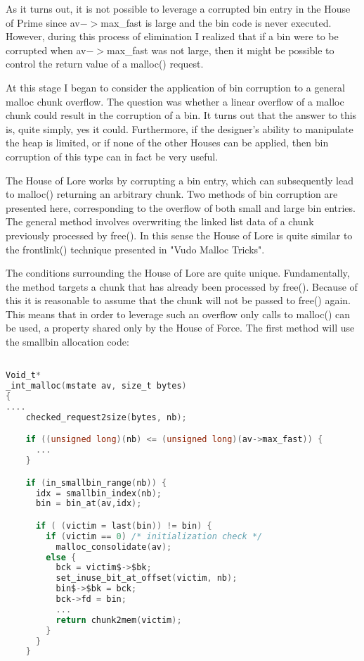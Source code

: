 \documentclass[12pt]{article}
\begin{document}
As it turns out, it is not possible to leverage a corrupted bin
entry in the House of Prime since av$->$max\_fast is large and the bin
code is never executed. However, during this process of elimination
I realized that if a bin were to be corrupted when av$->$max\_fast was
not large, then it might be possible to control the return value of
a malloc() request.
\newline


At this stage I began to consider the application of bin corruption
to a general malloc chunk overflow. The question was whether a
linear overflow of a malloc chunk could result in the corruption of
a bin. It turns out that the answer to this is, quite simply, yes
it could. Furthermore, if the designer's ability to manipulate the
heap is limited, or if none of the other Houses can be applied,
then bin corruption of this type can in fact be very useful.
\newline


The House of Lore works by corrupting a bin entry, which can
subsequently lead to malloc() returning an arbitrary chunk. Two
methods of bin corruption are presented here, corresponding to the
overflow of both small and large bin entries. The general method
involves overwriting the linked list data of a chunk previously
processed by free(). In this sense the House of Lore is quite
similar to the frontlink() technique presented in "Vudo Malloc
Tricks".
\newline


The conditions surrounding the House of Lore are quite unique.
Fundamentally, the method targets a chunk that has already been
processed by free(). Because of this it is reasonable to assume
that the chunk will not be passed to free() again. This means that
in order to leverage such an overflow only calls to malloc() can be
used, a property shared only by the House of Force. The first
method will use the smallbin allocation code:

\begin{lstlisting}[language=C]

Void_t*
_int_malloc(mstate av, size_t bytes)
{
....
    checked_request2size(bytes, nb);

    if ((unsigned long)(nb) <= (unsigned long)(av->max_fast)) {
      ...
    }

    if (in_smallbin_range(nb)) {
      idx = smallbin_index(nb);
      bin = bin_at(av,idx);

      if ( (victim = last(bin)) != bin) {
        if (victim == 0) /* initialization check */
          malloc_consolidate(av);
        else {
          bck = victim$->$bk;
          set_inuse_bit_at_offset(victim, nb);
          bin$->$bk = bck;
          bck->fd = bin;
          ...
          return chunk2mem(victim);
        }
      }
    }
\end{lstlisting}
\end{document}
